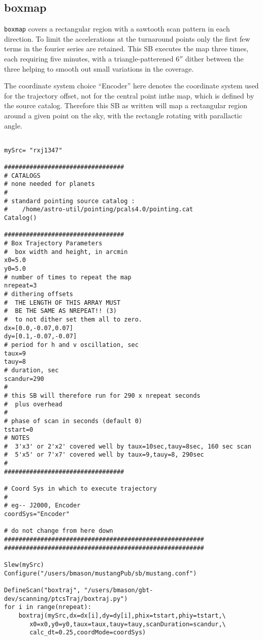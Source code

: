 \subsection{boxmap}

{\tt boxmap} covers a rectangular region with a sawtooth scan pattern
in each direction. To limit the accelerations at the turnaround points
only the first few terms in the fourier series are retained. This SB
executes the map three times, each requiring five minutes, with a
triangle-patterened $6''$ dither between the three helping to smooth
out small variations in the coverage.

The coordinate system choice ``Encoder'' here denotes the coordinate
system used for the trajectory offset, not for the central point inthe
map, which is defined by the source catalog. Therefore this SB as
written will map a rectangular region around a given point on the sky,
with the rectangle rotating with parallactic angle.

\begin{lstlisting}

mySrc= "rxj1347"

#################################
# CATALOGS
# none needed for planets
#
# standard pointing source catalog :
#    /home/astro-util/pointing/pcals4.0/pointing.cat
Catalog()

#################################
# Box Trajectory Parameters
#  box width and height, in arcmin
x0=5.0
y0=5.0
# number of times to repeat the map
nrepeat=3
# dithering offsets
#  THE LENGTH OF THIS ARRAY MUST
#  BE THE SAME AS NREPEAT!! (3)
#  to not dither set them all to zero.
dx=[0.0,-0.07,0.07]
dy=[0.1,-0.07,-0.07]
# period for h and v oscillation, sec
taux=9
tauy=8
# duration, sec
scandur=290
#
# this SB will therefore run for 290 x nrepeat seconds
#  plus overhead
#
# phase of scan in seconds (default 0)
tstart=0
# NOTES
#  3'x3' or 2'x2' covered well by taux=10sec,tauy=8sec, 160 sec scan
#  5'x5' or 7'x7' covered well by taux=9,tauy=8, 290sec
#
#################################

# Coord Sys in which to execute trajectory
#
# eg-- J2000, Encoder
coordSys="Encoder"

# do not change from here down
#######################################################
#######################################################

Slew(mySrc)
Configure("/users/bmason/mustangPub/sb/mustang.conf")

DefineScan("boxtraj", "/users/bmason/gbt-dev/scanning/ptcsTraj/boxtraj.py")
for i in range(nrepeat):
    boxtraj(mySrc,dx=dx[i],dy=dy[i],phix=tstart,phiy=tstart,\
       x0=x0,y0=y0,taux=taux,tauy=tauy,scanDuration=scandur,\
       calc_dt=0.25,coordMode=coordSys)

\end{lstlisting}

